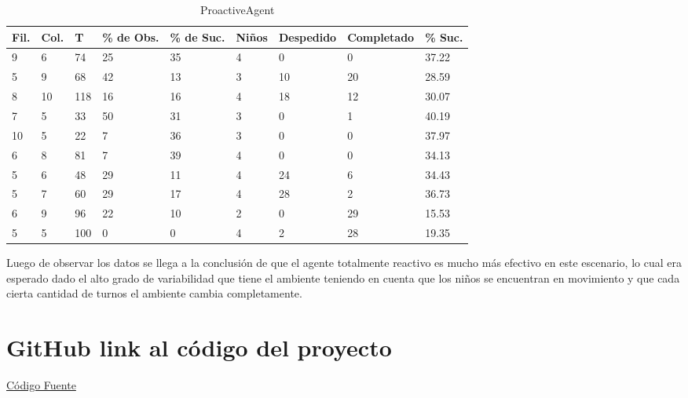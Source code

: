 \documentclass[12pt]{article}
\begin{document}
\begin{table}
	\small
	\begin{center}
		\begin{tabular} {| l | l  | l | l | l | l | l | l | l |}
			\hline
			Fil. & Col.& T & \% de Obs. & \% de Suc. & Ni\~nos & Despedido & Completado & \% Suc.\\ 
			\hline
			9 & 6 & 74 & 25 & 35 & 4 & 0 & 0 & 37.22 \\
			\hline
			5 & 9 & 68 & 42 & 13 & 3 & 10 & 20 & 28.59 \\
			\hline
			8 & 10 & 118 & 16 & 16 & 4 & 18 & 12 & 30.07 \\ 
			\hline
			7 & 5 & 33 & 50 & 31 & 3 & 0 & 1 & 40.19 \\ 
			\hline 
			10 & 5 & 22 & 7 & 36 & 3 & 0 & 0 & 37.97 \\ 
			\hline
			6 & 8 & 81 & 7 & 39 & 4 & 0 & 0 & 34.13 \\ 
			\hline
			5 & 6 & 48 & 29 & 11 & 4 & 24 & 6 & 34.43 \\
			\hline
			5 & 7 & 60 & 29 & 17 & 4 & 28 & 2 & 36.73 \\ 
			\hline
			6 & 9 & 96 & 22 & 10 & 2 & 0 & 29 & 15.53 \\ 
			\hline
			5 & 5 & 100 & 0 & 0 & 4 & 2 & 28 & 19.35 \\ 
			\hline
	 	\end{tabular}
		\caption{ProactiveAgent}
	\end{center}	
\end{table}
\newline
\newline
\newline
\newline
Luego de observar los datos se llega a la conclusi\'on de que el agente totalmente reactivo es mucho m\'as efectivo en este escenario,
lo cual era esperado dado el alto grado de variabilidad que tiene el ambiente teniendo en cuenta que los ni\~nos se encuentran en movimiento y 
que cada cierta cantidad de turnos el ambiente cambia completamente.

\section{GitHub link al c\'odigo del proyecto}
\href{https://github.com/stdevMauricio1802/Simulation}{C\'odigo Fuente}
\end{document}
